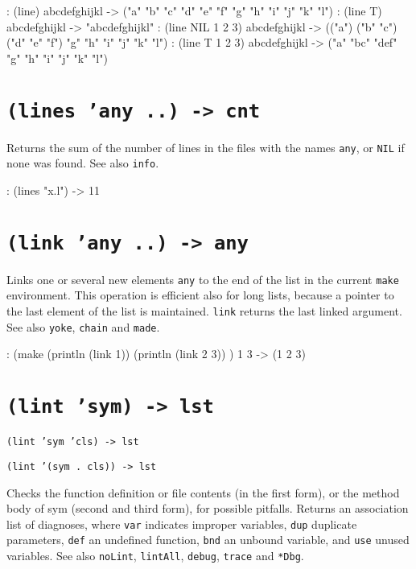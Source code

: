 \begin{wideverbatim}
: (line)
abcdefghijkl
-> ("a" "b" "c" "d" "e" "f" "g" "h" "i" "j" "k" "l")
: (line T)
abcdefghijkl
-> "abcdefghijkl"
: (line NIL 1 2 3)
abcdefghijkl
-> (("a") ("b" "c") ("d" "e" "f") "g" "h" "i" "j" "k" "l")
: (line T 1 2 3)
abcdefghijkl
-> ("a" "bc" "def" "g" "h" "i" "j" "k" "l")
\end{wideverbatim}

 
\section*{\texttt{(lines 'any ..) -> cnt}}
\label{sec:func-ref-L-(lines 'any ..) -> cnt}


Returns the sum of the number of lines in the files with the names
\texttt{any}, or \texttt{NIL} if none was found. See also \texttt{info}.


\begin{wideverbatim}
: (lines "x.l")
-> 11
\end{wideverbatim}

 
\section*{\texttt{(link 'any ..) -> any}}
\label{sec:func-ref-L-(link 'any ..) -> any}


Links one or several new elements \texttt{any} to the end of the list in the
current \texttt{make} environment. This operation is efficient also for long
lists, because a pointer to the last element of the list is maintained.
\texttt{link} returns the last linked argument. See also \texttt{yoke}, \texttt{chain} and
\texttt{made}.


\begin{wideverbatim}
: (make
   (println (link 1))
   (println (link 2 3)) )
1
3
-> (1 2 3)
\end{wideverbatim}

 
\section*{\texttt{(lint 'sym) -> lst}}
\label{sec:func-ref-L-(lint 'sym) -> lst}


\texttt{(lint 'sym 'cls) -> lst}

\texttt{(lint '(sym . cls)) -> lst}

Checks the function definition or file contents (in the first form), or
the method body of sym (second and third form), for possible pitfalls.
Returns an association list of diagnoses, where \texttt{var} indicates improper
variables, \texttt{dup} duplicate parameters, \texttt{def} an undefined function,
\texttt{bnd} an unbound variable, and \texttt{use} unused variables. See also
\texttt{noLint}, \texttt{lintAll}, \texttt{debug}, \texttt{trace} and \texttt{*Dbg}.


